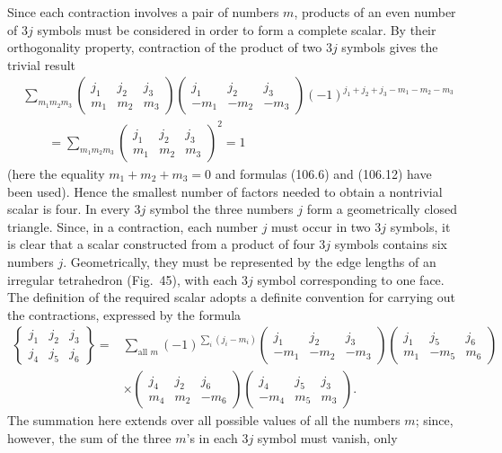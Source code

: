 Since each contraction involves a pair of numbers $m$, products of an even number of $3j$ symbols must be considered in order to form a complete scalar. By their orthogonality property, contraction of the product of two $3j$ symbols gives the trivial result
\[
\begin{aligned}
&\sum_{m_1m_2m_3}
\begin{pmatrix}j_1&j_2&j_3\\m_1&m_2&m_3\end{pmatrix}
\begin{pmatrix}j_1&j_2&j_3\\-m_1&-m_2&-m_3\end{pmatrix}
(-1)^{j_1+j_2+j_3-m_1-m_2-m_3}\\
&\qquad=\sum_{m_1m_2m_3}
\begin{pmatrix}j_1&j_2&j_3\\m_1&m_2&m_3\end{pmatrix}^{2}=1
\end{aligned}
\]
(here the equality $m_1+m_2+m_3=0$ and formulas (106.6) and (106.12) have been used). Hence the smallest number of factors needed to obtain a nontrivial scalar is four. In every $3j$ symbol the three numbers $j$ form a geometrically closed triangle. Since, in a contraction, each number $j$ must occur in two $3j$ symbols, it is clear that a scalar constructed from a product of four $3j$ symbols contains six numbers $j$. Geometrically, they must be represented by the edge lengths of an irregular tetrahedron (Fig.~45), with each $3j$ symbol corresponding to one face. The definition of the required scalar adopts a definite convention for carrying out the contractions, expressed by the formula
\begin{equation}
\begin{aligned}
\left\{\begin{matrix}j_1&j_2&j_3\\j_4&j_5&j_6\end{matrix}\right\}
={}&\sum_{\text{all }m}(-1)^{\sum_i(j_i-m_i)}
\begin{pmatrix}j_1&j_2&j_3\\-m_1&-m_2&-m_3\end{pmatrix}
\begin{pmatrix}j_1&j_5&j_6\\m_1&-m_5&m_6\end{pmatrix}\\
&\times\begin{pmatrix}j_4&j_2&j_6\\m_4&m_2&-m_6\end{pmatrix}
\begin{pmatrix}j_4&j_5&j_3\\-m_4&m_5&m_3\end{pmatrix}.
\end{aligned}
\tag{108.2}
\end{equation}
The summation here extends over all possible values of all the numbers $m$; since, however, the sum of the three $m$'s in each $3j$ symbol must vanish, only


